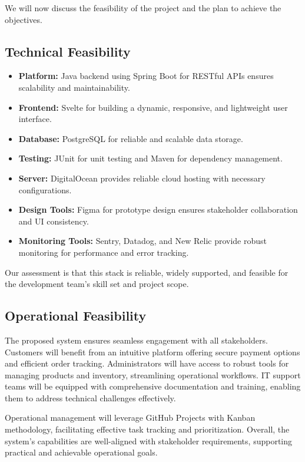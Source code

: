 \documentclass[a4paper,journal]{IEEEtran}
\begin{document}
We will now discuss the feasibility of the project and the plan to achieve the
objectives.

\subsection{Technical Feasibility}
\begin{itemize}
  \item \textbf{Platform:} Java backend using Spring Boot for RESTful APIs
    ensures scalability and maintainability.
  \item \textbf{Frontend:} Svelte for building a dynamic, responsive, and
    lightweight user interface.
  \item \textbf{Database:} PostgreSQL for reliable and scalable data storage.
  \item \textbf{Testing:} JUnit for unit testing and Maven for dependency
    management.
  \item \textbf{Server:} DigitalOcean provides reliable cloud hosting with
    necessary configurations.
  \item \textbf{Design Tools:} Figma for prototype design ensures stakeholder
    collaboration and UI consistency.
  \item \textbf{Monitoring Tools:} Sentry, Datadog, and New Relic provide robust
    monitoring for performance and error tracking.
\end{itemize}

Our assessment is that this stack is reliable, widely supported, and feasible
for the development team's skill set and project scope.

\subsection{Operational Feasibility}
The proposed system ensures seamless engagement with all stakeholders.
Customers will benefit from an intuitive platform offering secure payment
options and efficient order tracking.
Administrators will have access to robust tools for managing products and
inventory, streamlining operational workflows.
IT support teams will be equipped with comprehensive documentation and training,
enabling them to address technical challenges effectively.

Operational management will leverage GitHub Projects with Kanban methodology,
facilitating effective task tracking and prioritization. Overall, the system's
capabilities are well-aligned with stakeholder requirements, supporting
practical and achievable operational goals.
\end{document}
